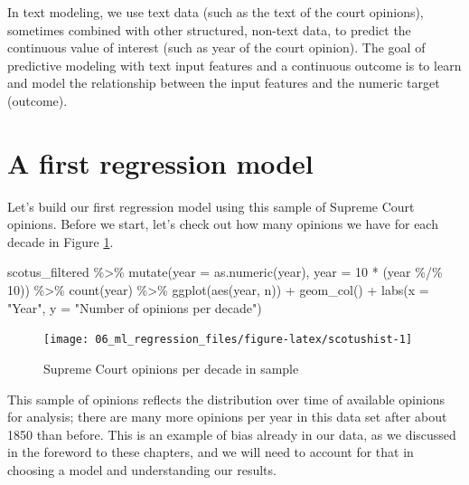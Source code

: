 \documentclass[
]{krantz}
\makeatletter
\newenvironment{Shaded}{\begin{snugshade}}{\end{snugshade}}
\newcommand{\AttributeTok}[1]{\textcolor[rgb]{0.77,0.63,0.00}{#1}}
\newcommand{\DecValTok}[1]{\textcolor[rgb]{0.00,0.00,0.81}{#1}}
\newcommand{\FunctionTok}[1]{\textcolor[rgb]{0.00,0.00,0.00}{#1}}
\newcommand{\NormalTok}[1]{#1}
\newcommand{\SpecialCharTok}[1]{\textcolor[rgb]{0.00,0.00,0.00}{#1}}
\newcommand{\StringTok}[1]{\textcolor[rgb]{0.31,0.60,0.02}{#1}}
\newenvironment{kframe}{%
\medskip{}
\setlength{\fboxsep}{.8em}
 \def\at@end@of@kframe{}%
 \ifinner\ifhmode%
  \def\at@end@of@kframe{\end{minipage}}%
  \begin{minipage}{\columnwidth}%
 \fi\fi%
 \def\FrameCommand##1{\hskip\@totalleftmargin \hskip-\fboxsep
 \colorbox{shadecolor}{##1}\hskip-\fboxsep
     \hskip-\linewidth \hskip-\@totalleftmargin \hskip\columnwidth}%
 \MakeFramed {\advance\hsize-\width
   \@totalleftmargin\z@ \linewidth\hsize
   \@setminipage}}%
 {\par\unskip\endMakeFramed%
 \at@end@of@kframe}
\renewenvironment{Shaded}{\begin{kframe}}{\end{kframe}}
\makeatother
\begin{document}
In text modeling, we use text data (such as the text of the court opinions), sometimes combined with other structured, non-text data, to predict the continuous value of interest (such as year of the court opinion). The goal of predictive modeling with text input features and a continuous outcome is to learn and model the relationship between the input features and the numeric target (outcome).

\hypertarget{firstmlregression}{%
\section{A first regression model}\label{firstmlregression}}

Let's build our first regression model using this sample of Supreme Court opinions. Before we start, let's check out how many opinions we have for each decade in Figure \ref{fig:scotushist}.

\begin{Shaded}
\begin{Highlighting}[]
\NormalTok{scotus\_filtered }\SpecialCharTok{\%\textgreater{}\%}
  \FunctionTok{mutate}\NormalTok{(}\AttributeTok{year =} \FunctionTok{as.numeric}\NormalTok{(year),}
         \AttributeTok{year =} \DecValTok{10} \SpecialCharTok{*}\NormalTok{ (year }\SpecialCharTok{\%/\%} \DecValTok{10}\NormalTok{)) }\SpecialCharTok{\%\textgreater{}\%}
  \FunctionTok{count}\NormalTok{(year) }\SpecialCharTok{\%\textgreater{}\%}
  \FunctionTok{ggplot}\NormalTok{(}\FunctionTok{aes}\NormalTok{(year, n)) }\SpecialCharTok{+}
  \FunctionTok{geom\_col}\NormalTok{() }\SpecialCharTok{+}
  \FunctionTok{labs}\NormalTok{(}\AttributeTok{x =} \StringTok{"Year"}\NormalTok{, }\AttributeTok{y =} \StringTok{"Number of opinions per decade"}\NormalTok{)}
\end{Highlighting}
\end{Shaded}

\begin{figure}

{\centering \texttt{[image: 06\_ml\_regression\_files/figure-latex/scotushist-1]} 

}

\caption{Supreme Court opinions per decade in sample}\label{fig:scotushist}
\end{figure}

This sample of opinions reflects the distribution over time of available opinions for analysis; there are many more opinions per year in this data set after about 1850 than before. This is an example of bias already in our data, as we discussed in the foreword to these chapters, and we will need to account for that in choosing a model and understanding our results.
\end{document}
